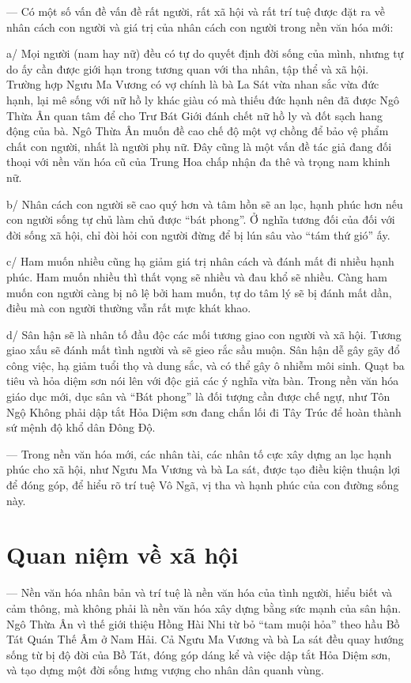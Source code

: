 — Có một số vấn đề vấn đề rất người, rất xã hội và rất trí tuệ được đặt ra về nhân cách con người và giá trị của nhân cách con người trong nền văn hóa mới:

a/ Mọi người (nam hay nữ) đều có tự do quyết định đời sống của mình, nhưng tự do ấy cần được giới hạn trong tương quan với tha nhân, tập thể và xã hội. Trường hợp Ngưu Ma Vương có vợ chính là bà La Sát vừa nhan sắc vừa đức hạnh, lại mê sống với nữ hồ ly khác giàu có mà thiếu đức hạnh nên đã được Ngô Thừa Ân quan tâm để cho Trư Bát Giới đánh chết nữ hồ ly và đốt sạch hang động của bà. Ngô Thừa Ân muốn đề cao chế độ một vợ chồng để bảo vệ phẩm chất con người, nhất là người phụ nữ. Đây cũng là một vấn đề tác giả đang đối thoại với nền văn hóa cũ của Trung Hoa chấp nhận đa thê và trọng nam khinh nữ.

b/ Nhân cách con người sẽ cao quý hơn và tâm hồn sẽ an lạc, hạnh phúc hơn nếu con người sống tự chủ làm chủ được ``bát phong''. Ở nghĩa tương đối của đối với đời sống xã hội, chỉ đòi hỏi con người đừng để bị lún sâu vào ``tám thứ gió'' ấy.

c/ Ham muốn nhiều cũng hạ giảm giá trị nhân cách và đánh mất đi nhiều hạnh phúc. Ham muốn nhiều thì thất vọng sẽ nhiều và đau khổ sẽ nhiều. Càng ham muốn con người càng bị nô lệ bởi ham muốn, tự do tâm lý sẽ bị đánh mất dần, điều mà con người thường vẫn rất mực khát khao.

d/ Sân hận sẽ là nhân tố đầu độc các mối tương giao con người và xã hội. Tương giao xấu sẽ đánh mất tình người và sẽ gieo rắc sầu muộn. Sân hận dễ gây gãy đổ công việc, hạ giảm tuổi thọ và dung sắc, và có thể gây ô nhiễm môi sinh. Quạt ba tiêu và hỏa diệm sơn nói lên với độc giả các ý nghĩa vừa bàn. Trong nền văn hóa giáo dục mới, dục sân và ``Bát phong'' là đối tượng cần được chế ngự, như Tôn Ngộ Không phải dập tắt Hỏa Diệm sơn đang chắn lối đi Tây Trúc để hoàn thành sứ mệnh độ khổ dân Đông Độ.

— Trong nền văn hóa mới, các nhân tài, các nhân tố cực xây dựng an lạc hạnh phúc cho xã hội, như Ngưu Ma Vương và bà La sát, được tạo điều kiện thuận lợi để đóng góp, để hiểu rõ trí tuệ Vô Ngã, vị tha và hạnh phúc của con đường sống này.

\section{Quan niệm về xã hội} %
\label{sec:59_60_xa_hoi}

— Nền văn hóa nhân bản và trí tuệ là nền văn hóa của tình người, hiểu biết và cảm thông, mà không phải là nền văn hóa xây dựng bằng sức mạnh của sân hận. Ngô Thừa Ân vì thế giới thiệu Hồng Hài Nhi từ bỏ ``tam muội hỏa'' theo hầu Bồ Tát Quán Thế Âm ở Nam Hải. Cả Ngưu Ma Vương và bà La sát đều quay hướng sống từ bị độ đời của Bồ Tát, đóng góp dáng kể và việc dập tắt Hỏa Diệm sơn, và tạo dựng một đời sống hưng vượng cho nhân dân quanh vùng.

